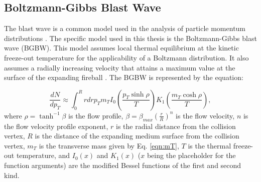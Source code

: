 \subsection{Boltzmann-Gibbs Blast Wave}
% 
The blast wave is a common model used in the analysis of particle momentum distributions \cite{Tang:2008ud,Tripathy:2017kwb,PhysRevC.96.044904}. The specific model used in this thesis is the Boltzmann-Gibbs blast wave (BGBW). This model assumes local thermal equilibrium at the kinetic freeze-out temperature for the applicability of a Boltzmann distribution. It also assumes a radially increasing velocity that attains a maximum value at the surface of the expanding fireball \cite{Tripathy:2017kwb}. The BGBW is represented by the equation: %

	\begin{equation}\label{eqn:BGBW}
	\frac{dN}{dp_{T}} \approx \int_{0}^{R} rdrp_{T}m_{T}I_{0}(\frac{p_{T}\sinh\rho}{T})K_{1}(\frac{m_{T}\cosh\rho}{T}),
	\end{equation}
where $\rho = \tanh^{-1}\beta$ is the flow profile, $\beta = \beta_{max}(\frac{r}{R})^{n}$ is the flow velocity, $n$ is the flow velocity profile exponent, $r$ is the radial distance from the collision vertex, $R$ is the distance of the expanding medium surface from the collision vertex, $m_{T}$ is the transverse mass given by Eq. \ref{eqn:mT}, $T$ is the thermal freeze-out temperature, and $I_{0}(x)$ and $K_{1}(x)$ ($x$ being the placeholder for the function arguments) are the modified Bessel functions of the first and second kind.




